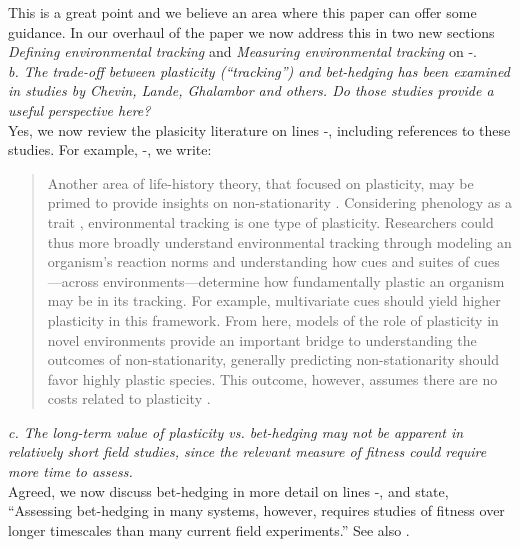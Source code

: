 \documentclass[11pt]{article}
\begin{document}
This is a great point and we believe an area where this paper can offer some guidance. In our overhaul of the paper we now address this in two new sections \emph{Defining environmental tracking} and \emph{Measuring environmental tracking} on -.\\

\emph{b.      The trade-off between plasticity (``tracking'') and bet-hedging has been examined in
studies by Chevin, Lande, Ghalambor and others. Do those studies provide a useful perspective
here?}\\

Yes, we now review the plasicity literature on lines -, including references to these studies. For example, -, we write: 
\begin{quote}
Another area of life-history theory, that focused on plasticity, may be primed to provide insights on non-stationarity \citep[or `sustained environmental change,' see][]{chevin2010}. Considering phenology as a trait \citep[as we and others do, e.g.,][]{charm2008,nicotra2010,inouye2019}, environmental tracking is one type of plasticity. Researchers could thus more broadly understand environmental tracking through modeling an organism's reaction norms \citep{pigluicci1998,chmura2019} and understanding how cues and suites of cues---across environments---determine how fundamentally plastic an organism may be in its tracking. For example, multivariate cues should yield higher plasticity in this framework. From here, models of the role of plasticity in novel environments provide an important bridge to understanding the outcomes of non-stationarity, generally predicting non-stationarity should favor highly plastic species. This outcome, however, assumes there are no costs related to plasticity \citep{Ghalambor2007,tufto2015}. 
\end{quote}

\emph{c.      The long-term value of plasticity vs. bet-hedging may not be apparent in relatively
short field studies, since the relevant measure of fitness could require more time to assess.}\\

Agreed, we now discuss bet-hedging in more detail on lines -, and state, ``Assessing bet-hedging in many systems, however, requires studies of fitness over longer timescales than many current field experiments.'' See also .
\end{document}
